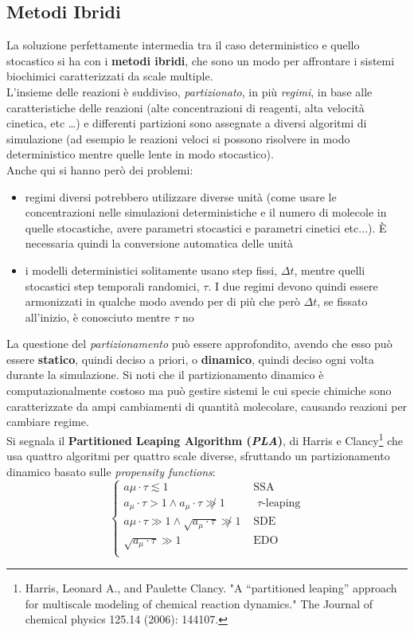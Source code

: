 \documentclass[a4paper,12pt, oneside]{book}
\begin{document}
\subsection{Metodi Ibridi}
La soluzione perfettamente intermedia tra il caso deterministico e quello
stocastico si ha con i \textbf{metodi ibridi}, che sono un modo per affrontare i
sistemi biochimici caratterizzati da scale multiple.\\
L'insieme delle reazioni è suddiviso, \textit{partizionato}, in più
\textit{regimi}, in base alle 
caratteristiche delle reazioni (alte concentrazioni di reagenti,
alta velocità cinetica, etc \ldots) e differenti partizioni sono assegnate a
diversi algoritmi di simulazione (ad esempio le reazioni veloci si possono
risolvere in modo deterministico mentre quelle lente in modo stocastico).\\
Anche qui si hanno però dei problemi:
\begin{itemize}
  \item regimi diversi potrebbero utilizzare diverse unità (come usare le
  concentrazioni nelle simulazioni deterministiche e il numero di molecole in
  quelle stocastiche, avere parametri stocastici e parametri cinetici
  etc$\ldots$). È necessaria quindi la conversione automatica delle unità
  \item i modelli deterministici solitamente usano step fissi, $\Delta t$,
  mentre quelli stocastici step temporali randomici, $\tau$. I due regimi
  devono quindi essere armonizzati in qualche modo avendo per di più che però
  $\Delta t$, se fissato all'inizio, è conosciuto mentre $\tau$ no
\end{itemize}
La questione del \textit{partizionamento} può essere approfondito, avendo che
esso può essere \textbf{statico}, quindi deciso a priori, o \textbf{dinamico},
quindi deciso ogni volta durante la simulazione. Si noti che il partizionamento
dinamico è computazionalmente costoso ma può gestire sistemi le cui specie
chimiche sono caratterizzate da ampi cambiamenti di quantità molecolare,
causando reazioni per cambiare regime.\\
Si segnala il \textbf{Partitioned Leaping Algorithm (\textit{PLA})}, di Harris e
Clancy\footnote{Harris, Leonard A., and Paulette Clancy. "A “partitioned
  leaping” approach for multiscale modeling of chemical reaction dynamics." The
  Journal of chemical physics 125.14 (2006): 144107.} che usa quattro algoritmi
per quattro scale diverse, sfruttando un partizionamento dinamico basato sulle
\textit{propensity functions}:
\[
  \begin{cases}
    a\mu\cdot\tau \lesssim 1&\mbox{ SSA}\\
    a_\mu\cdot\tau > 1 \land  a_\mu\cdot\tau \not\gg 1 &\mbox{ $\tau$-leaping}\\
    a\mu\cdot\tau\gg 1\land \sqrt{a_\mu\cdot \tau}\not\gg 1 &\mbox{ SDE}\\
    \sqrt{a_\mu\cdot \tau}\gg 1  &\mbox{ EDO}\\
  \end{cases}
\]
\end{document}
